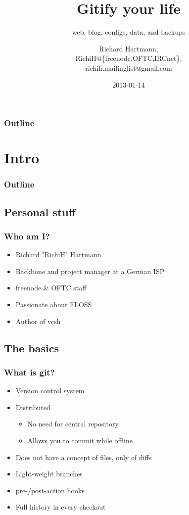 \documentclass[t]{beamer}
\title{Gitify your life}
\subtitle{web, blog, configs, data, and backups}
\author{Richard Hartmann,\\
RichiH@\{freenode,OFTC,IRCnet\},\\
richih.mailinglist@gmail.com}
\date{2013-01-14}
\begin{document}
\setcounter{tocdepth}{1}

\begin{frame}
	\titlepage
\end{frame}

\begin{frame}
	\frametitle{Outline}
	\tableofcontents
\end{frame}


\section{Intro}

\begin{frame}
	\frametitle{Outline}
	\tableofcontents[currentsection]
\end{frame}

\subsection{Personal stuff}

\begin{frame}
	\frametitle{Who am I?}
	\begin{itemize}
		\item Richard "RichiH" Hartmann
		\item Backbone and project manager at a German ISP
		\item freenode \& OFTC staff
		\item Passionate about FLOSS
		\item Author of vcsh
	\end{itemize}
\end{frame}

\subsection{The basics}

\begin{frame}
	\frametitle{What is git?}
	\begin{itemize}
		\item Version control system
		\item Distributed
		\begin{itemize}
			\item No need for central repository
			\item Allows you to commit while offline
		\end{itemize}
		\item Does not have a concept of files, only of diffs
		\item Light-weight branches
		\item pre-/post-action hooks
		\item Full history in every checkout
	\end{itemize}
\end{frame}
\end{document}
